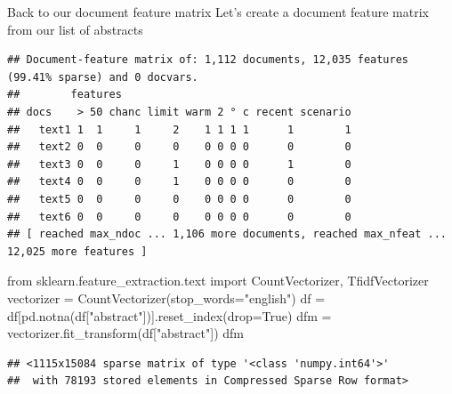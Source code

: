 \documentclass[
  10pt,
  ignorenonframetext,
  aspectratio=169]{beamer}
\newenvironment{Shaded}{\begin{snugshade}}{\end{snugshade}}
\newcommand{\AttributeTok}[1]{\textcolor[rgb]{0.80,0.80,0.80}{#1}}
\newcommand{\ConstantTok}[1]{\textcolor[rgb]{0.86,0.64,0.64}{\textbf{#1}}}
\newcommand{\FunctionTok}[1]{\textcolor[rgb]{0.94,0.94,0.56}{#1}}
\newcommand{\ImportTok}[1]{\textcolor[rgb]{0.80,0.80,0.80}{#1}}
\newcommand{\NormalTok}[1]{\textcolor[rgb]{0.80,0.80,0.80}{#1}}
\newcommand{\OperatorTok}[1]{\textcolor[rgb]{0.94,0.94,0.82}{#1}}
\newcommand{\OtherTok}[1]{\textcolor[rgb]{0.94,0.94,0.56}{#1}}
\newcommand{\SpecialCharTok}[1]{\textcolor[rgb]{0.86,0.64,0.64}{#1}}
\newcommand{\StringTok}[1]{\textcolor[rgb]{0.80,0.58,0.58}{#1}}
\newcommand{\VariableTok}[1]{\textcolor[rgb]{0.80,0.80,0.80}{#1}}
\begin{document}
\begin{frame}[fragile]{Back to our document feature matrix}
\protect\hypertarget{back-to-our-document-feature-matrix}{}
Let's create a document feature matrix from our list of abstracts

\scriptsize

\begin{Shaded}
\end{Shaded}

\begin{verbatim}
## Document-feature matrix of: 1,112 documents, 12,035 features (99.41% sparse) and 0 docvars.
##        features
## docs    > 50 chanc limit warm 2 ° c recent scenario
##   text1 1  1     1     2    1 1 1 1      1        1
##   text2 0  0     0     0    0 0 0 0      0        0
##   text3 0  0     0     1    0 0 0 0      1        0
##   text4 0  0     0     1    0 0 0 0      0        0
##   text5 0  0     0     0    0 0 0 0      0        0
##   text6 0  0     0     0    0 0 0 0      0        0
## [ reached max_ndoc ... 1,106 more documents, reached max_nfeat ... 12,025 more features ]
\end{verbatim}

\begin{Shaded}
\begin{Highlighting}[]
\ImportTok{from}\NormalTok{ sklearn.feature\_extraction.text }\ImportTok{import}\NormalTok{ CountVectorizer, TfidfVectorizer}
\NormalTok{vectorizer }\OperatorTok{=}\NormalTok{ CountVectorizer(stop\_words}\OperatorTok{=}\StringTok{"english"}\NormalTok{)}
\NormalTok{df }\OperatorTok{=}\NormalTok{ df[pd.notna(df[}\StringTok{"abstract"}\NormalTok{])].reset\_index(drop}\OperatorTok{=}\VariableTok{True}\NormalTok{)}
\NormalTok{dfm }\OperatorTok{=}\NormalTok{ vectorizer.fit\_transform(df[}\StringTok{"abstract"}\NormalTok{])}
\NormalTok{dfm}
\end{Highlighting}
\end{Shaded}

\begin{verbatim}
## <1115x15084 sparse matrix of type '<class 'numpy.int64'>'
##  with 78193 stored elements in Compressed Sparse Row format>
\end{verbatim}
\end{frame}
\end{document}
